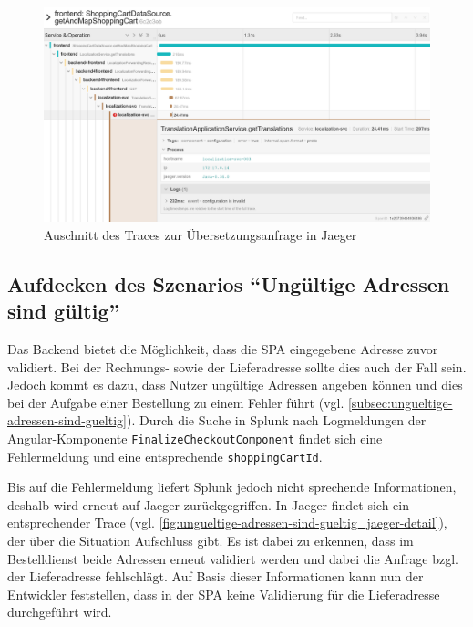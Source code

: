\begin{figure}[H]
	\centering
	\includegraphics[width=1.00\linewidth]{img/05_ergebnis/keine-uebersetzungen_jaeger_detail.png}
	\caption{Auschnitt des Traces zur Übersetzungsanfrage in Jaeger}
	\label{fig:keine-uebersetzungen_jaeger_detail}
\end{figure}

\subsection{Aufdecken des Szenarios \enquote{Ungültige Adressen sind gültig}}

Das Backend bietet die Möglichkeit, dass die SPA eingegebene Adresse zuvor validiert. Bei der Rechnungs- sowie der Lieferadresse sollte dies auch der Fall sein. Jedoch kommt es dazu, dass Nutzer ungültige Adressen angeben können und dies bei der Aufgabe einer Bestellung zu einem Fehler führt (vgl. \autoref{subsec:ungueltige-adressen-sind-gueltig}). Durch die Suche in Splunk nach Logmeldungen der Angular-Komponente \texttt{Finalize\-Checkout\-Component} findet sich eine Fehlermeldung und eine entsprechende \texttt{shopping\-Cart\-Id}.

Bis auf die Fehlermeldung liefert Splunk jedoch nicht sprechende Informationen, deshalb wird erneut auf Jaeger zurückgegriffen. In Jaeger findet sich ein entsprechender Trace (vgl. \autoref{fig:ungueltige-adressen-sind-gueltig_jaeger-detail}), der über die Situation Aufschluss gibt. Es ist dabei zu erkennen, dass im Bestelldienst beide Adressen erneut validiert werden und dabei die Anfrage bzgl. der Lieferadresse fehlschlägt. Auf Basis dieser Informationen kann nun der Entwickler feststellen, dass in der SPA keine Validierung für die Lieferadresse durchgeführt wird.

